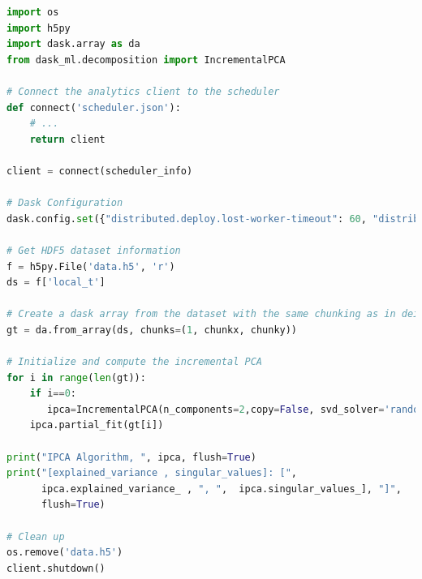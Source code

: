 \begin{lstlisting}[float, label=list:daskanalyse, language=python, caption= Dask IPCA code]
import os
import h5py
import dask.array as da
from dask_ml.decomposition import IncrementalPCA

# Connect the analytics client to the scheduler
def connect('scheduler.json'):
    # ...
    return client

client = connect(scheduler_info)

# Dask Configuration 
dask.config.set({"distributed.deploy.lost-worker-timeout": 60, "distributed.workers.memory.spill":0.97, "distributed.workers.memory.target":0.95, "distributed.workers.memory.terminate":0.99 })

# Get HDF5 dataset information
f = h5py.File('data.h5', 'r') 
ds = f['local_t']

# Create a dask array from the dataset with the same chunking as in deisa 
gt = da.from_array(ds, chunks=(1, chunkx, chunky))

# Initialize and compute the incremental PCA
for i in range(len(gt)):
    if i==0:
       ipca=IncrementalPCA(n_components=2,copy=False, svd_solver='randomized') 
    ipca.partial_fit(gt[i])

print("IPCA Algorithm, ", ipca, flush=True)
print("[explained_variance , singular_values]: [", 
      ipca.explained_variance_ , ", ",  ipca.singular_values_], "]", 
      flush=True)

# Clean up    
os.remove('data.h5') 
client.shutdown()

\end{lstlisting}




